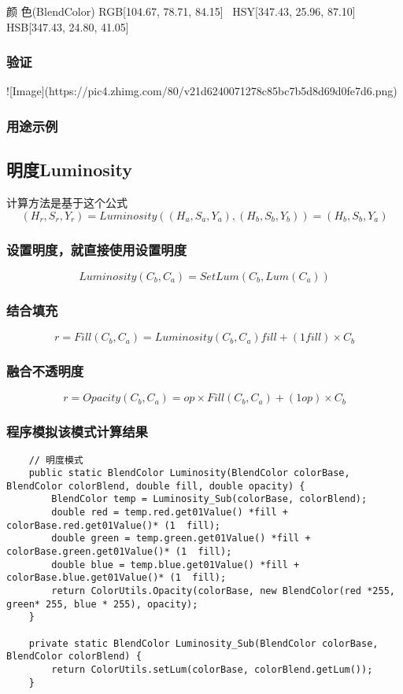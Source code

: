 颜    色(BlendColor)    RGB[104.67,  78.71,  84.15]~ HSY[347.43,  25.96,  87.10]~ HSB[347.43,  24.80,  41.05]


\subsubsection{ 验证}

![Image](https://pic4.zhimg.com/80/v21d6240071278c85bc7b5d8d69d0fe7d6.png)

\subsubsection{ 用途示例}

\subsection{ 明度Luminosity}

计算方法是基于这个公式
$$(H_r,S_r,Y_r)= Luminosity((H_a,S_a,Y_a),(H_b,S_b,Y_b))=(H_b,S_b,Y_a)$$

\subsubsection{ 设置明度，就直接使用设置明度}

$$Luminosity(C_b,C_a)=SetLum(C_b,Lum(C_a))$$

\subsubsection{ 结合填充}

$$r=Fill(C_b,C_a)= Luminosity(C_b,C_a) fill + (1fill)\times C_b$$

\subsubsection{ 融合不透明度}

$$r=Opacity(C_b,C_a)=op\times Fill(C_b,C_a)+(1op)\times C_b$$

\subsubsection{ 程序模拟该模式计算结果}

\begin{lstlisting}
	// 明度模式
	public static BlendColor Luminosity(BlendColor colorBase, BlendColor colorBlend, double fill, double opacity) {
		BlendColor temp = Luminosity_Sub(colorBase, colorBlend);
		double red = temp.red.get01Value() *fill + colorBase.red.get01Value()* (1  fill);
		double green = temp.green.get01Value() *fill + colorBase.green.get01Value()* (1  fill);
		double blue = temp.blue.get01Value() *fill + colorBase.blue.get01Value()* (1  fill);
		return ColorUtils.Opacity(colorBase, new BlendColor(red *255, green* 255, blue * 255), opacity);
	}
	
	private static BlendColor Luminosity_Sub(BlendColor colorBase, BlendColor colorBlend) {
		return ColorUtils.setLum(colorBase, colorBlend.getLum());
	}
\end{lstlisting}



